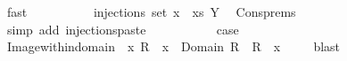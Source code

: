 \begin{isabellebody}
\ fast\isanewline
\ \ \isanewline
\ \ \isamarkupfalse%
\ \isamarkupfalse%
\ {\isachardoublequoteopen}{\isasymdots}\ {\isacharequal}\ injections\ {\isacharparenleft}set\ {\isacharparenleft}x\ {\isacharhash}\ xs{\isacharparenright}{\isacharparenright}\ Y{\isachardoublequoteclose}\ \isamarkupfalse%
\ Cons{\isachardot}prems\ \isamarkupfalse%
\ {\isacharparenleft}simp\ add{\isacharcolon}\ injections{\isacharunderscore}paste{\isacharparenright}\isanewline
\ \ \isanewline
\ \ \isanewline
\ \ \isamarkupfalse%
\ \isamarkupfalse%
\ {\isacharquery}case\ \isacommand{{\isachardot}}\isamarkupfalse%
\isanewline
{}\isamarkupfalse%
%
\endisatagproof
{\isafoldproof}%
%
\isadelimproof
\isanewline
%
\endisadelimproof
\isanewline
{}\isamarkupfalse%
\ Image{\isacharunderscore}within{\isacharunderscore}domain{\isacharprime}{\isacharcolon}\ \ x\ R\ \ {\isachardoublequoteopen}x\ {\isasymin}\ Domain\ R\ {\isacharequal}\ {\isacharparenleft}R\ {\isacharbackquote}{\isacharbackquote}\ {\isacharbraceleft}x{\isacharbraceright}\ {\isasymnoteq}\ {\isacharbraceleft}{\isacharbraceright}{\isacharparenright}{\isachardoublequoteclose}%
\isadelimproof
\ %
\endisadelimproof
%
\isatagproof
{}\isamarkupfalse%
\ blast%
\endisatagproof
{\isafoldproof}%
%
\isadelimproof
%
\endisadelimproof
\isanewline
%
\isadelimtheory
\isanewline
%
\endisadelimtheory
%
\isatagtheory
{}\isamarkupfalse%
%
\endisatagtheory
{\isafoldtheory}%
%
\isadelimtheory
%
\endisadelimtheory
\end{isabellebody}%
